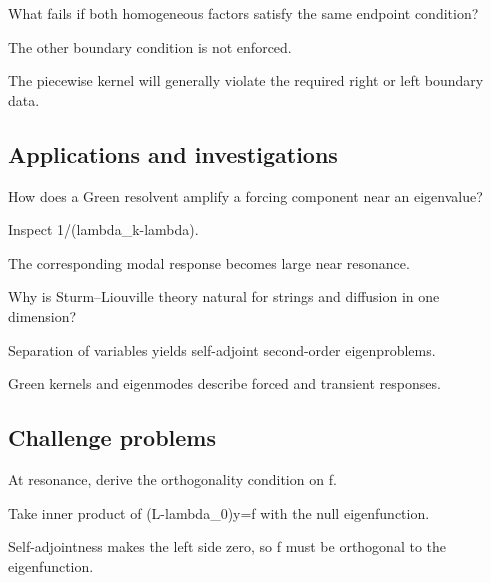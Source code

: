 \begin{exercise}\label{exr:iii26-expand-12}
What fails if both homogeneous factors satisfy the same endpoint condition?
\end{exercise}
\begin{hint}
The other boundary condition is not enforced.
\end{hint}
\begin{solution}
The piecewise kernel will generally violate the required right or left boundary data.
\end{solution}

\subsection*{Applications and investigations}

\begin{exercise}\label{exr:iii26-expand-13}
How does a Green resolvent amplify a forcing component near an eigenvalue?
\end{exercise}
\begin{hint}
Inspect 1/(lambda\_k-lambda).
\end{hint}
\begin{solution}
The corresponding modal response becomes large near resonance.
\end{solution}

\begin{exercise}\label{exr:iii26-expand-14}
Why is Sturm--Liouville theory natural for strings and diffusion in one dimension?
\end{exercise}
\begin{hint}
Separation of variables yields self-adjoint second-order eigenproblems.
\end{hint}
\begin{solution}
Green kernels and eigenmodes describe forced and transient responses.
\end{solution}

\subsection*{Challenge problems}

\begin{exercise}[Compatibility]\label{exr:iii26-expand-15}
At resonance, derive the orthogonality condition on f.
\end{exercise}
\begin{hint}
Take inner product of (L-lambda\_0)y=f with the null eigenfunction.
\end{hint}
\begin{solution}
Self-adjointness makes the left side zero, so f must be orthogonal to the eigenfunction.
\end{solution}

